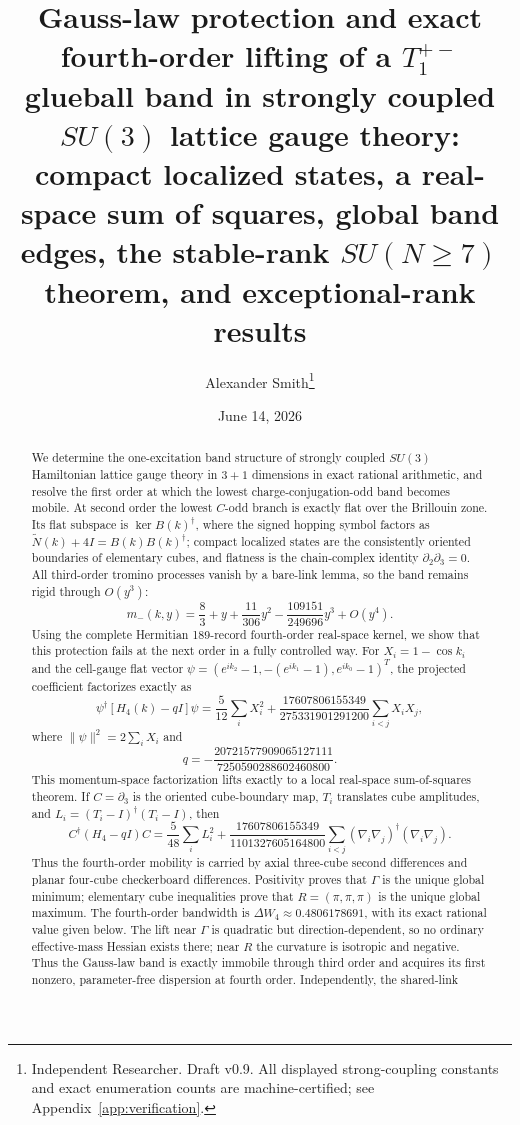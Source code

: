 \documentclass[11pt]{article}
\title{Gauss-law protection and exact fourth-order lifting of a
$T_1^{+-}$ glueball band in strongly coupled $SU(3)$ lattice gauge theory:\\
compact localized states, a real-space sum of squares, global band edges,
the stable-rank $SU(N\geq7)$ theorem, and exceptional-rank results}
\author{Alexander Smith\thanks{Independent Researcher. Draft v0.9. All displayed
strong-coupling constants and exact enumeration counts are machine-certified;
see Appendix~\ref{app:verification}.}}
\date{June 14, 2026}
\begin{document}
\maketitle

\begin{abstract}
We determine the one-excitation band structure of strongly coupled $SU(3)$
Hamiltonian lattice gauge theory in $3{+}1$ dimensions in exact rational
arithmetic, and resolve the first order at which the lowest
charge-conjugation-odd band becomes mobile. At second order the lowest
$C$-odd branch is exactly flat over the Brillouin zone. Its flat subspace is
$\ker B(k)^\dagger$, where the signed hopping symbol factors as
$\widetilde N(k)+4I=B(k)B(k)^\dagger$; compact localized states are the
consistently oriented boundaries of elementary cubes, and flatness is the
chain-complex identity $\partial_2\partial_3=0$. All third-order tromino
processes vanish by a bare-link lemma, so the band remains rigid through
$O(y^3)$:
\[
m_-(k,y)=\frac83+y+\frac{11}{306}y^2
-\frac{109151}{249696}y^3+O(y^4).
\]
Using the complete Hermitian 189-record fourth-order real-space kernel, we
show that this protection fails at the next order in a fully controlled way.
For $X_i=1-\cos k_i$ and the cell-gauge flat vector
$\psi=(e^{ik_2}-1,-(e^{ik_1}-1),e^{ik_0}-1)^T$, the projected coefficient
factorizes exactly as
\[
\psi^\dagger[H_4(k)-qI]\psi
=\frac5{12}\sum_iX_i^2
+\frac{17607806155349}{275331901291200}
 \sum_{i<j}X_iX_j,
\]
where $\|\psi\|^2=2\sum_iX_i$ and
\[
q=-\frac{20721577909065127111}{7250590288602460800}.
\]
This momentum-space factorization lifts exactly to a local real-space
sum-of-squares theorem. If $C=\partial_3$ is the oriented cube-boundary map,
$T_i$ translates cube amplitudes, and
$L_i=(T_i-I)^\dagger(T_i-I)$, then
\[
C^\dagger(H_4-qI)C
=\frac{5}{48}\sum_iL_i^2
+\frac{17607806155349}{1101327605164800}
 \sum_{i<j}(\nabla_i\nabla_j)^\dagger(\nabla_i\nabla_j).
\]
Thus the fourth-order mobility is carried by axial three-cube second
differences and planar four-cube checkerboard differences. Positivity proves that $\Gamma$ is the unique global minimum; elementary
cube inequalities prove that $R=(\pi,\pi,\pi)$ is the unique global
maximum. The fourth-order bandwidth is $\Delta W_4\approx0.4806178691$,
with its exact rational value given below. The lift near $\Gamma$ is quadratic but
direction-dependent, so no ordinary effective-mass Hessian exists there;
near $R$ the curvature is isotropic and negative. Thus the Gauss-law band is
exactly immobile through third order and acquires its first nonzero,
parameter-free dispersion at fourth order. Independently, the shared-link

\end{abstract}
\end{document}
